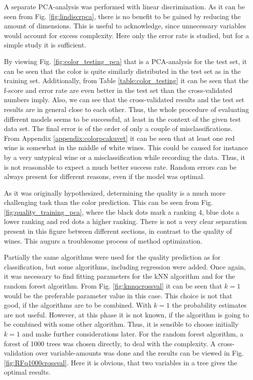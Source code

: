 \documentclass[twoside]{article}
\begin{document}
\begin{multicols}{2}
A separate PCA-analysis was performed with linear discrimination. As it can be seen from Fig. \ref{fig:lindiscrpca}, there is no
benefit to be gained by reducing the amount of dimensions. This is useful to acknowledge, since unnecessary variables would
account for excess complexity. Here only the error rate is studied, but for a simple study it is sufficient.

By viewing Fig. \ref{fig:color_testing_pca} that is a PCA-analysis for the test set, it can be seen that the color is quite similarly 
distributed in the test set as in the training set. Additionally, from Table \ref{table:color_testing} it can be seen that the f-score and
error rate are even better in the test set than the cross-validated numbers imply. Also, we can see that the cross-validated results and the
test set results are in general close to each other. Thus, the whole procedure of evaluating different models seems to be successful,
at least in the context of the given test data set. The final error is of the order of only a couple of misclassifications. From Appendix
\ref{appendix:colorpcakuvet} it can be seen that at least one red wine is somewhat in the middle of white wines. This could be caused for instance 
by a very untypical wine or a misclassification while recording the data. Thus, it is not reasonable to expect a much better success rate. Random
errors can be always present for different reasons, even if the model was optimal.

As it was originally hypothesized, determining the quality is a much more challenging task than the color prediction. This can be seen from Fig.
\ref{fig:quality_training_pca}, where the black dots mark a ranking 4, blue dots a lower ranking and red dots a higher ranking. There is not a
very clear separation present in this figure between different sections, in contrast to the quality of wines. This augurs a troublesome
process of method optimization.

Partially the same algorithms were used for the quality prediction as for classification, but some algorithms, including regression were added.
Once again, it was necessary to find fitting parameters for the kNN algorithm and for the random forest algorithm. From Fig. \ref{fig:knnqcrossval}
it can be seen that $k = 1$ would be the preferable parameter value in this case. This choice is not that good, if the algorithms are to be combined.
With $k = 1$ the probability estimates are not useful. However, at this phase it is not known, if the algorithm is going to be combined with some other
algorithm. Thus, it is sensible to choose initially $k = 1$ and make further considerations later. For the random forest algorithm, 
a forest of 1000 trees was chosen directly, to deal with the complexity. A cross-validation over variable-amounts was done
and the results can be viewed in Fig. \ref{fig:RFq1000crossval}. Here it is obvious, that two variables in a tree gives the optimal results.


\end{multicols}
\end{document}
